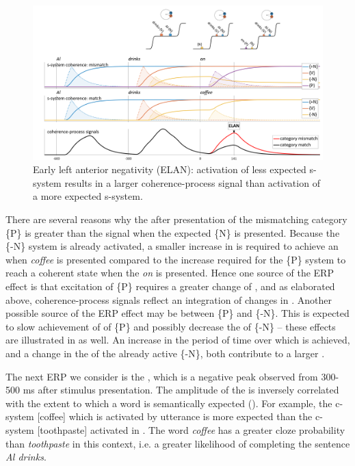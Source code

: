   
\begin{figure}
\includegraphics[width=\textwidth]{figures/Tilsen-img142.png}
\caption{Early left anterior negativity (ELAN): activation of less expected s-system results in a larger coherence-process signal than activation of a more expected s-system.}
\label{fig:6:23}
\end{figure}
 

There are several reasons why the  after presentation of the mismatching category \{P\} is greater than the signal when the expected \{N\} is presented. Because the \{-N\} system is already activated, a smaller increase in  is required to achieve an  when \textit{coffee} is presented compared to the increase required for the \{P\} system to reach a coherent state when the  \textit{on} is presented. Hence one source of the ERP effect is that excitation of \{P\} requires a greater change of , and as elaborated above, coherence-process signals reflect an integration of changes in . Another possible source of the ERP effect may be  between \{P\} and \{-N\}. This  is expected to slow achievement of  of \{P\} and possibly decrease the  of \{-N\} -- these effects are illustrated in {} as well. An increase in the period of time over which  is achieved, and a change in the  of the already active \{-N\}, both contribute to a larger .

  The next ERP we consider is the , which is a negative peak observed from 300-500 ms after stimulus presentation. The amplitude of the  is inversely correlated with the extent to which a word is semantically expected (\citealt{FedermeierLaszlo2009,Friederici2002,KutasFedermeier2011}). For example, the c-system [coffee] which is activated by utterance  is more expected than the c-system [toothpaste] activated in . The word \textit{coffee} has a greater cloze probability than \textit{toothpaste} in this context, i.e. a greater likelihood of completing the sentence \textit{Al drinks}.

